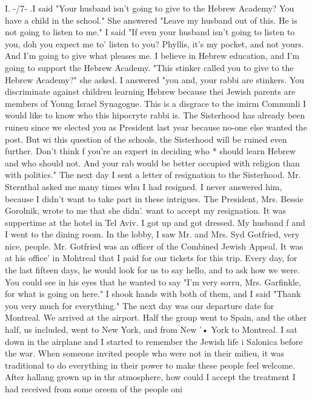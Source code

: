 I. 
-/7- 
.I said "Your husband isn't going to give to the Hebrew Academy? You have a child 
in the school." She answered "Leave my husband out of this. He is not going to listen 
to me." I said "If even your husband isn't going to listen to you, doh you expect me to' 
listen to you? Phyllis, it's my pocket, and not yours. And I'm going to give what 
pleases me. I believe in Hebrew education, and I'm going to support the Hebrew Academy. 
"This stinker called you to give to the Hebrew Academy?" she asked. I answered "you and, 
your rabbi are stinkers. You discriminate against children learning Hebrew because thei 
Jewish 
parents are members of Young Israel Synagogue. This is a disgrace to the imirm Communli 
I would like to know who this hipocryte rabbi is. The Sisterhood has already been ruineu 
since we elected you as President last year because no-one else wanted the post. But wi 
this question of the schools, the Sisterhood will be ruined even further. Don't think 
f 
you're an expert in deciding who * should learn Hebrew and who should not. And your rab 
would be better occupied with religion than with politics." 
The next day I sent a letter of resignation to the Sisterhood. Mr. Sternthal asked 
me many times whu I had resigned. I never answered him, because I didn't want to take 
part in these intrigues. The President, Mrs. Bessie Gorolnik, wrote to me that she didn'. 
want to accept my resignation. 
It was suppertime at the hotel in Tel Aviv. I got up and got dressed. My husband f 
and I went to the dining room. In the lobby, I saw Mr. and Mrs. Syd Gotfried, very nice, 
people. Mr. Gotfried was an officer of the Combined Jewish Appeal. It was at his office' 
in Mohtreal that I paid for our tickets for this trip. Every day, for the last fifteen 
days, he would look for us to say hello, and to ask how we were. You could see in his 
eyes that he wanted to say "I'm very sorru, Mrs. Garfinkle, for what is going on here." 
I shook hands with both of them, and I said "Thank you very much for everything." 
The next day was our departure date for Montreal. We arrived at the airport. Half 
the group went to Spain, and the other half, us included, went to New York, and from New '• 
York to Montreal. I sat down in the airplane and I started to remember the Jewish life i 
Salonica before the war. 
When someone invited people who were not in their milieu, it was traditional to do 
everything in their power to make these people feel welcome. After 
hallang grown up in thr 
atmosphere, how could I accept the treatment I had received from some oreem of the people oni 
